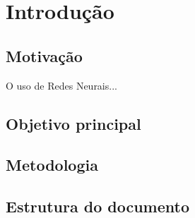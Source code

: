 \chapter{Introdução}

\section{Motivação}
O uso de Redes Neurais...

\section{Objetivo principal}

\section{Metodologia}

\section{Estrutura do documento}
